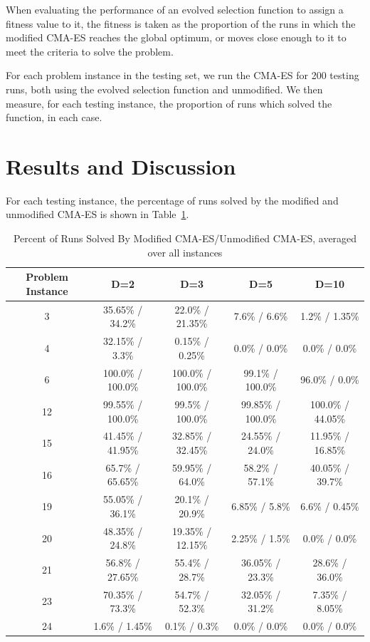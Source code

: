 \documentclass[sigconf]{acmart}
\begin{document}
When evaluating the performance of an evolved selection function to assign a fitness value to it, the fitness is taken as the proportion of the runs in which the modified CMA-ES reaches the global optimum, or moves close enough to it to meet the criteria to solve the problem.

For each problem instance in the testing set, we run the CMA-ES for 200 testing runs, both using the evolved selection function and unmodified. We then measure, for each testing instance, the proportion of runs which solved the function, in each case. 

\section{Results and Discussion}
\label{Results}

For each testing instance, the percentage of runs solved by the modified and unmodified CMA-ES is shown in Table~\ref{tab:experiment3Results}.

\begin{table}
	\centering
	\caption{Percent of Runs Solved By Modified CMA-ES/Unmodified CMA-ES, averaged over all instances}
	\label{tab:experiment3Results}
	\begin{tabular}{c|c|c|c|c}
		\toprule
		Problem Instance & D=2 & D=3 & D=5 & D=10\\
		\hline
		3 &  35.65\% / 34.2\%  &  22.0\% / 21.35\%  &  7.6\% / 6.6\%  &  1.2\% / 1.35\% \\
		\hline
		4 &  32.15\% / 3.3\%  &  0.15\% / 0.25\%  &  0.0\% / 0.0\%  &  0.0\% / 0.0\% \\
		\hline
		6 &  100.0\% / 100.0\%  &  100.0\% / 100.0\%  &  99.1\% / 100.0\%  &  96.0\% / 0.0\% \\
		\hline
		12 &  99.55\% / 100.0\%  &  99.5\% / 100.0\%  &  99.85\% / 100.0\%  &  100.0\% / 44.05\% \\
		\hline
		15 &  41.45\% / 41.95\%  &  32.85\% / 32.45\%  &  24.55\% / 24.0\%  &  11.95\% / 16.85\% \\
		\hline
		16 &  65.7\% / 65.65\%  &  59.95\% / 64.0\%  &  58.2\% / 57.1\%  &  40.05\% / 39.7\% \\
		\hline
		19 &  55.05\% / 36.1\%  &  20.1\% / 20.9\%  &  6.85\% / 5.8\%  &  6.6\% / 0.45\% \\
		\hline
		20 &  48.35\% / 24.8\%  &  19.35\% / 12.15\%  &  2.25\% / 1.5\%  &  0.0\% / 0.0\% \\
		\hline
		21 &  56.8\% / 27.65\%  &  55.4\% / 28.7\%  &  36.05\% / 23.3\%  &  28.6\% / 36.0\% \\
		\hline
		23 &  70.35\% / 73.3\%  &  54.7\% / 52.3\%  &  32.05\% / 31.2\%  &  7.35\% / 8.05\% \\
		\hline
		24 &  1.6\% / 1.45\%  &  0.1\% / 0.3\%  &  0.0\% / 0.0\%  &  0.0\% / 0.0\% \\
		\hline

		\bottomrule
	\end{tabular}
\end{table}
\end{document}

